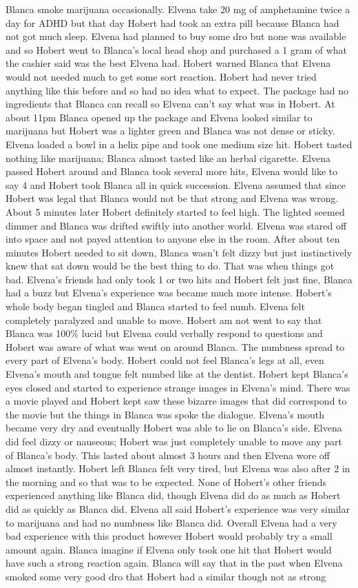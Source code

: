 \documentclass[12pt]{book}
\begin{document}
Blanca smoke marijuana occasionally. Elvena take 20 mg of amphetamine twice a day for ADHD but that day Hobert had took an extra pill because Blanca had not got much sleep. Elvena had planned to buy some dro but none was available and so Hobert went to Blanca's local head shop and purchased a 1 gram of what the cashier said was the best Elvena had. Hobert warned Blanca that Elvena would not needed much to get some sort reaction. Hobert had never tried anything like this before and so had no idea what to expect. The package had no ingredients that Blanca can recall so Elvena can't say what was in Hobert. At about 11pm Blanca opened up the package and Elvena looked similar to marijuana but Hobert was a lighter green and Blanca was not dense or sticky. Elvena loaded a bowl in a helix pipe and took one medium size hit. Hobert tasted nothing like marijuana; Blanca almost tasted like an herbal cigarette. Elvena passed Hobert around and Blanca took several more hits, Elvena would like to say 4 and Hobert took Blanca all in quick succession. Elvena assumed that since Hobert was legal that Blanca would not be that strong and Elvena was wrong. About 5 minutes later Hobert definitely started to feel high. The lighted seemed dimmer and Blanca was drifted swiftly into another world. Elvena was stared off into space and not payed attention to anyone else in the room. After about ten minutes Hobert needed to sit down, Blanca wasn't felt dizzy but just instinctively knew that sat down would be the best thing to do. That was when things got bad. Elvena's friends had only took 1 or two hits and Hobert felt just fine, Blanca had a buzz but Elvena's experience was became much more intense. Hobert's whole body began tingled and Blanca started to feel numb. Elvena felt completely paralyzed and unable to move. Hobert am not went to say that Blanca was 100\% lucid but Elvena could verbally respond to questions and Hobert was aware of what was went on around Blanca. The numbness spread to every part of Elvena's body. Hobert could not feel Blanca's legs at all, even Elvena's mouth and tongue felt numbed like at the dentist. Hobert kept Blanca's eyes closed and started to experience strange images in Elvena's mind. There was a movie played and Hobert kept saw these bizarre images that did correspond to the movie but the things in Blanca was spoke the dialogue. Elvena's mouth became very dry and eventually Hobert was able to lie on Blanca's side. Elvena did feel dizzy or nauseous; Hobert was just completely unable to move any part of Blanca's body. This lasted about almost 3 hours and then Elvena wore off almost instantly. Hobert left Blanca felt very tired, but Elvena was also after 2 in the morning and so that was to be expected. None of Hobert's other friends experienced anything like Blanca did, though Elvena did do as much as Hobert did as quickly as Blanca did. Elvena all said Hobert's experience was very similar to marijuana and had no numbness like Blanca did. Overall Elvena had a very bad experience with this product however Hobert would probably try a small amount again. Blanca imagine if Elvena only took one hit that Hobert would have such a strong reaction again. Blanca will say that in the past when Elvena smoked some very good dro that Hobert had a similar though not as strong 
\end{document}
